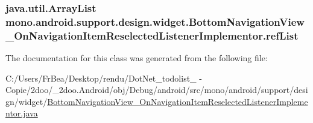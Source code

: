 \hypertarget{classmono_1_1android_1_1support_1_1design_1_1widget_1_1_bottom_navigation_view___on_navigation_ibc61d53e910ce9033a3261f22503637c_2cb893a0361285d48291f61372a4f4a1}{
\subsubsection[{refList}]{\setlength{\rightskip}{0pt plus 5cm}java.util.ArrayList {\bf mono.android.support.design.widget.BottomNavigationView\_\-OnNavigationItemReselectedListenerImplementor.refList}}}
\label{classmono_1_1android_1_1support_1_1design_1_1widget_1_1_bottom_navigation_view___on_navigation_ibc61d53e910ce9033a3261f22503637c_2cb893a0361285d48291f61372a4f4a1}




The documentation for this class was generated from the following file:\begin{CompactItemize}
\item 
C:/Users/FrBea/Desktop/rendu/DotNet\_\-todolist\_ - Copie/2doo/\_\-2doo.Android/obj/Debug/android/src/mono/android/support/design/widget/\hyperlink{_bottom_navigation_view___on_navigation_item_reselected_listener_implementor_8java}{BottomNavigationView\_\-OnNavigationItemReselectedListenerImplementor.java}\end{CompactItemize}
